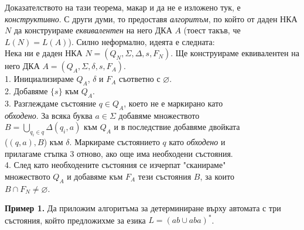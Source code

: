 \documentclass{article}
\begin{document}
    Доказателството на тази теорема, макар и да не е изложено тук, е \textit{конструктивно}.
    С други думи, то предоставя \textit{алгоритъм}, по който от даден НКА $N$ да 
    конструираме \textit{еквивалентен} на него ДКА $A$ (тоест такъв, че $L(N) = L(A)$).
    Силно неформално, идеята е следната: \\
    \vspace{15pt}
    Нека ни е даден НКА $N = (Q_N,\Sigma,\Delta,s,F_N)$. Ще конструираме еквивалентен
    на него ДКА $A = (Q_A,\Sigma,\delta,s,F_A)$. \\
    \hspace{1cm} 1. Инициализираме $Q_A$, $\delta$ и $F_A$ съответно с $\varnothing$. \\
    \hspace{1cm} 2. Добавяме $\{s\}$ към $Q_A$. \\
    \hspace{1cm} 3. Разглеждаме състояние $q \in Q_A$, което не е маркирано като \\
    \hspace{1cm} \textit{обходено}.  За всяка буква $a \in \Sigma$ добавяме множеството \\
    \hspace{1cm} $B = \bigcup\limits_{q_i \in q}\Delta(q_i,a)$ към $Q_A$ и в последствие добавяме двойката \\
    \hspace{1cm} ($(q,a),B$) към $\delta$. Маркираме състоянието $q$ като \textit{обходено} и \\
    \hspace{1cm} прилагаме стъпка 3 отново, ако още има необходени състояния. \\
    \hspace{1cm} 4. След като необходените състояния се изчерпат "сканираме" \hspace{0.01cm} \\
    \hspace{1cm} множеството $Q_A$ и добавяме към $F_A$ тези състояния $B$, за които \\
    \hspace{1cm} $B \cap F_N \neq \varnothing$.

    \vspace{15pt}

    \textbf{Пример 1.} Да приложим алгоритъма за детерминиране върху автомата с три 
    състояния, който предложихме за езика $L = ({ab} \cup {aba})^*$.

    \begin{center}
    \end{center}
\end{document}
